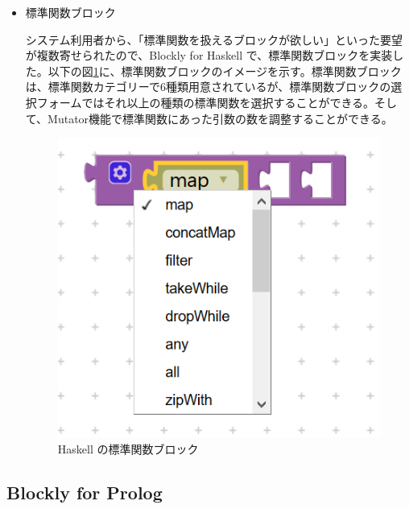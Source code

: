\documentclass{risepaper}
\begin{document}
\begin{itemize}
\item 標準関数ブロック

システム利用者から、「標準関数を扱えるブロックが欲しい」といった要望が複数寄せられたので、Blockly for Haskell で、標準関数ブロックを実装した。以下の図\ref{fig:haskell_standard_functions}に、標準関数ブロックのイメージを示す。標準関数ブロックは、標準関数カテゴリーで6種類用意されているが、標準関数ブロックの選択フォームではそれ以上の種類の標準関数を選択することができる。そして、Mutator機能で標準関数にあった引数の数を調整することができる。

\begin{figure}[h]
\begin{center}
\includegraphics[scale=0.5]{img/haskell_standard_functions.PNG}
\caption{Haskell の標準関数ブロック}%
\label{fig:haskell_standard_functions}
\end{center}%
\end{figure}%

\end{itemize} 

   \subsection{Blockly for Prolog}
   
\end{document}
